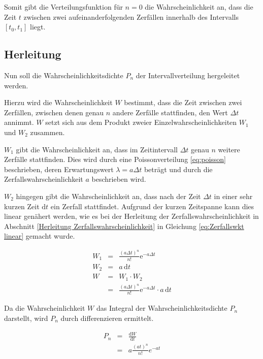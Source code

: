 \documentclass[12pt,a4paper]{scrartcl}
\numberwithin{equation}{section} %
\begin{document}
Somit gibt die Verteilungsfunktion für $n=0$ die Wahrscheinlichkeit an, dass die Zeit $t$ zwischen zwei aufeinanderfolgenden Zerfällen innerhalb des Intervalls $[t_0, t_1]$ liegt.

\hypertarget{Herleitung Intervallverteilung}{\subsection{Herleitung}\label{Herleitung Intervallverteilung}}
Nun soll die Wahrscheinlichkeitsdichte $P_n$ der Intervallverteilung hergeleitet werden.

Hierzu wird die Wahrscheinlichkeit $W$ bestimmt, dass die Zeit zwischen zwei Zerfällen, zwischen denen genau $n$ andere Zerfälle stattfinden, den Wert $\Delta t$ annimmt. $W$ setzt sich aus dem Produkt zweier Einzelwahrscheinlichkeiten $W_1$ und $W_2$ zusammen.

$W_1$ gibt die Wahrscheinlichkeit an, dass im Zeitintervall $\Delta t$ genau $n$ weitere Zerfälle stattfinden. Dies wird durch eine Poissonverteilung \eqref{eq:poisson} beschrieben, deren Erwartungswert $\lambda = a\Delta t$ beträgt und durch die Zerfallswahrscheinlichkeit $a$ beschrieben wird.

$W_2$ hingegen gibt die Wahrscheinlichkeit an, dass nach der Zeit $\Delta t$ in einer sehr kurzen Zeit $\mathrm dt$ ein Zerfall stattfindet. Aufgrund der kurzen Zeitspanne kann dies linear genähert werden, wie es bei der Herleitung der Zerfallswahrscheinlichkeit in Abschnitt \ref{Herleitung Zerfallswahrscheinlichkeit}  in Gleichung \eqref{eq:Zerfallswkt linear} gemacht wurde.

\begin{eqnarray}
	W_1 &=& \frac{(a\Delta t)^n}{n!} \mathrm{e}^{-a\Delta t} \\
	W_2 &=& a \,\mathrm dt \\
	W &=& W_1 \cdot W_2 \\
		&=& \frac{\left(a\Delta t\right)^n}{n!}  \mathrm{e}^{-a\Delta t} \cdot a \,\mathrm dt
\end{eqnarray}

\noindent
Da die Wahrscheinlichkeit $W$ das Integral der Wahrscheinlichkeitsdichte $P_n$ darstellt, wird $P_n$ durch differenzieren ermittelt.

\begin{eqnarray}
	P_n &=& \frac{\mathrm dW}{\mathrm dt} \\
		&=& a \frac{\left(at\right)^n}{n!} e^{-at}
\end{eqnarray}
\end{document}
